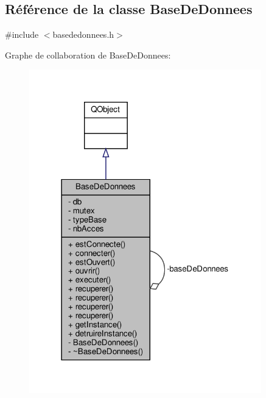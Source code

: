 \hypertarget{class_base_de_donnees}{}\subsection{Référence de la classe Base\+De\+Donnees}
\label{class_base_de_donnees}


{\ttfamily \#include $<$basededonnees.\+h$>$}



Graphe de collaboration de Base\+De\+Donnees\+:\nopagebreak
\begin{figure}[H]
\begin{center}
\leavevmode
\includegraphics[width=286pt]{class_base_de_donnees__coll__graph}
\end{center}
\end{figure}
